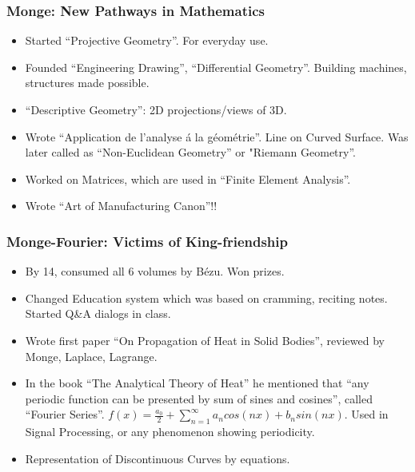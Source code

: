 \begin{frame}[fragile]
\frametitle{Monge: New Pathways in Mathematics}
\begin{itemize}[label=\textbullet,noitemsep,nolistsep]
\item Started ``Projective Geometry''. For everyday use.
\item Founded ``Engineering Drawing'', ``Differential Geometry''.  Building machines, structures made possible.
\item ``Descriptive Geometry'': 2D projections/views of 3D.
\item Wrote ``Application de l'analyse \'a la g\'eom\'etrie''. Line on Curved Surface. Was later called as ``Non-Euclidean Geometry'' or "Riemann Geometry''.
\item Worked on Matrices, which are used in ``Finite Element Analysis''.
\item Wrote ``Art of Manufacturing Canon''!! 
\end{itemize}
\end{frame}

\begin{frame}[fragile]
\frametitle{Monge-Fourier: Victims of King-friendship}
\begin{itemize}[label=\textbullet,noitemsep,nolistsep]
\item By 14, consumed all 6 volumes by B\'ezu. Won prizes.
\item Changed Education system which was based on cramming, reciting notes. Started Q\&A dialogs in class.
\item Wrote first paper ``On Propagation of Heat in Solid Bodies'', reviewed by Monge, Laplace, Lagrange.
\item In the book ``The Analytical Theory of Heat'' he mentioned that ``any periodic function can be presented by sum of sines and cosines'', called ``Fourier Series''. $ f(x) = \frac{a_0}{2} + \sum \limits^{\infty}_{n=1} a_n cos(nx) + b_n sin(nx)$. Used in Signal Processing, or any phenomenon showing periodicity.
\item Representation of Discontinuous Curves by equations.
\end{itemize}
\end{frame}

